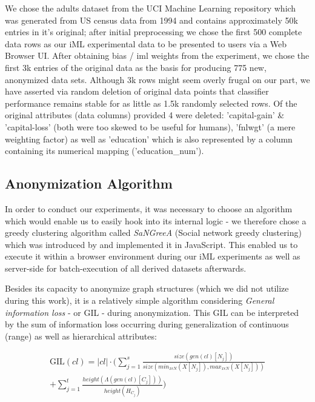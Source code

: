 \documentclass{llncs}
\providecommand{\abs}[1]{\lvert#1\rvert}
\begin{document}
We chose the adults dataset from the UCI Machine Learning repository which was generated from US census data from 1994 and contains approximately 50k entries in it's original; after initial preprocessing we chose the first 500 complete data rows as our iML experimental data to be presented to users via a Web Browser UI. After obtaining bias / iml weights from the experiment, we chose the first 3k entries of the original data as the basis for producing 775 new, anonymized data sets. Although 3k rows might seem overly frugal on our part, we have asserted via random deletion of original data points that classifier performance remains stable for as little as 1.5k randomly selected rows. Of the original attributes (data columns) provided 4 were deleted: 'capital-gain' \& 'capital-loss' (both were too skewed to be useful for humans), 'fnlwgt' (a mere weighting factor) as well as 'education' which is also represented by a column containing its numerical mapping ('education\_num').


\subsection{Anonymization Algorithm}
\label{ssect:algorithm}

In order to conduct our experiments, it was necessary to choose an algorithm which would enable us to easily hook into its internal logic - we therefore chose a greedy clustering algorithm called \textit{SaNGreeA} (Social network greedy clustering) which was introduced by \cite{campan2009data} and implemented it in JavaScript. This enabled us to execute it within a browser environment during our iML experiments as well as server-side for batch-execution of all derived datasets afterwards.

Besides its capacity to anonymize graph structures (which we did not utilize during this work), it is a relatively simple algorithm considering \textit{General information loss} - or GIL - during anonymization. This GIL can be interpreted by the sum of information loss occurring during generalization of continuous (range) as well as hierarchical attributes:

\begin{equation*}
\begin{split}
\text{GIL}(cl) = \abs{cl} \cdot (\sum_{j=1}^{s} \frac{size(gen(cl)[N_j])}{size(min_{x \epsilon N} (X[N_j]), max_{x \epsilon N} (X[N_j]))} \\
+ \sum_{j=1}^{t} \frac{height(\Lambda(gen(cl)[C_j]))}{height(H_{C_j})})
\end{split}
\end{equation*}
\end{document}
